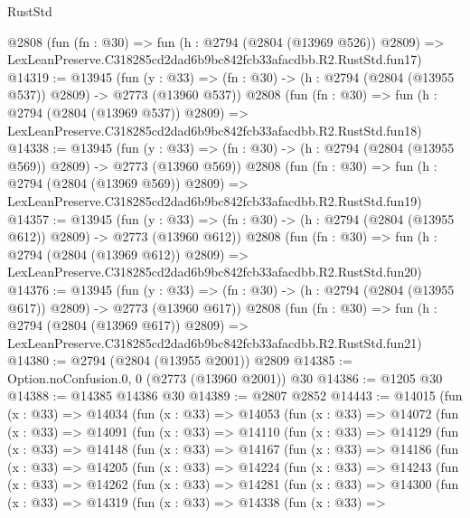 \begin{lexlean}{RustStd}
\begin{coremodule}
    @2808
    (fun (fn : @30) =>
    fun (h : @2794 (@2804 (@13969 @526)) @2809) =>
    LexLeanPreserve.C318285cd2dad6b9bc842fcb33afacdbb.R2.RustStd.fun17)
@14319 := @13945
    (fun (y : @33) => (fn : @30) -> (h : @2794 (@2804 (@13955 @537)) @2809) -> @2773 (@13960 @537))
    @2808
    (fun (fn : @30) =>
    fun (h : @2794 (@2804 (@13969 @537)) @2809) =>
    LexLeanPreserve.C318285cd2dad6b9bc842fcb33afacdbb.R2.RustStd.fun18)
@14338 := @13945
    (fun (y : @33) => (fn : @30) -> (h : @2794 (@2804 (@13955 @569)) @2809) -> @2773 (@13960 @569))
    @2808
    (fun (fn : @30) =>
    fun (h : @2794 (@2804 (@13969 @569)) @2809) =>
    LexLeanPreserve.C318285cd2dad6b9bc842fcb33afacdbb.R2.RustStd.fun19)
@14357 := @13945
    (fun (y : @33) => (fn : @30) -> (h : @2794 (@2804 (@13955 @612)) @2809) -> @2773 (@13960 @612))
    @2808
    (fun (fn : @30) =>
    fun (h : @2794 (@2804 (@13969 @612)) @2809) =>
    LexLeanPreserve.C318285cd2dad6b9bc842fcb33afacdbb.R2.RustStd.fun20)
@14376 := @13945
    (fun (y : @33) => (fn : @30) -> (h : @2794 (@2804 (@13955 @617)) @2809) -> @2773 (@13960 @617))
    @2808
    (fun (fn : @30) =>
    fun (h : @2794 (@2804 (@13969 @617)) @2809) =>
    LexLeanPreserve.C318285cd2dad6b9bc842fcb33afacdbb.R2.RustStd.fun21)
@14380 := @2794 (@2804 (@13955 @2001)) @2809
@14385 := Option.noConfusion.{0, 0} (@2773 (@13960 @2001)) @30
@14386 := @1205 @30
@14388 := @14385 @14386 @30
@14389 := @2807 @2852
@14443 := @14015
    (fun (x : @33) =>
    @14034
      (fun (x : @33) =>
      @14053
        (fun (x : @33) =>
        @14072
          (fun (x : @33) =>
          @14091
            (fun (x : @33) =>
            @14110
              (fun (x : @33) =>
              @14129
                (fun (x : @33) =>
                @14148
                  (fun (x : @33) =>
                  @14167
                    (fun (x : @33) =>
                    @14186
                      (fun (x : @33) =>
                      @14205
                        (fun (x : @33) =>
                        @14224
                          (fun (x : @33) =>
                          @14243
                            (fun (x : @33) =>
                            @14262
                              (fun (x : @33) =>
                              @14281
                                (fun (x : @33) =>
                                @14300
                                  (fun (x : @33) =>
                                  @14319
                                    (fun (x : @33) =>
                                    @14338
                                      (fun (x : @33) =>

\end{coremodule}
\end{lexlean}
